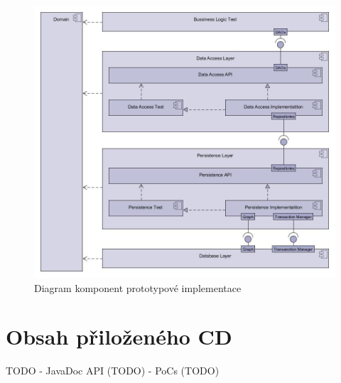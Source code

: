 \documentclass[11pt,twoside,a4paper]{book}
\begin{document}
\begin{figure}
\begin{center}
\includegraphics[width=14cm]{figures/modules}
\caption{Diagram komponent prototypové implementace}
\label{fig:poc_components}
\end{center}
\end{figure}

\chapter{Obsah přiloženého CD}
\label{apx:cd}
TODO
- JavaDoc API (TODO)
- PoCs (TODO)
\end{document}
